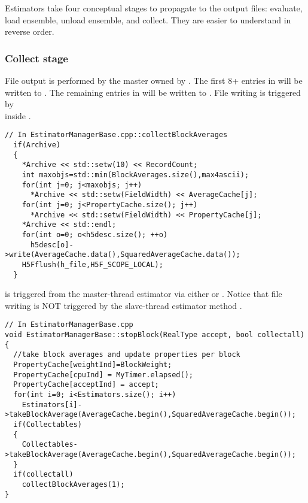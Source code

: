 Estimators take four conceptual stages to propagate to the output files: evaluate, load ensemble, unload ensemble, and collect. They are easier to understand in reverse order.

\subsubsection{Collect stage}
File output is performed by the master  owned by . The first 8+ entries in  will be written to . The remaining entries in  will be written to . File writing is triggered by \\  inside .

\begin{lstlisting}
// In EstimatorManagerBase.cpp::collectBlockAverages
  if(Archive)
  {
    *Archive << std::setw(10) << RecordCount;
    int maxobjs=std::min(BlockAverages.size(),max4ascii);
    for(int j=0; j<maxobjs; j++)
      *Archive << std::setw(FieldWidth) << AverageCache[j];
    for(int j=0; j<PropertyCache.size(); j++)
      *Archive << std::setw(FieldWidth) << PropertyCache[j];
    *Archive << std::endl;
    for(int o=0; o<h5desc.size(); ++o)
      h5desc[o]->write(AverageCache.data(),SquaredAverageCache.data());
    H5Fflush(h_file,H5F_SCOPE_LOCAL);
  }
\end{lstlisting}

 is triggered from the master-thread estimator via either  or . Notice that file writing is NOT triggered by the slave-thread estimator method .

\begin{lstlisting}
// In EstimatorManagerBase.cpp
void EstimatorManagerBase::stopBlock(RealType accept, bool collectall)
{
  //take block averages and update properties per block
  PropertyCache[weightInd]=BlockWeight;
  PropertyCache[cpuInd] = MyTimer.elapsed();
  PropertyCache[acceptInd] = accept;
  for(int i=0; i<Estimators.size(); i++)
    Estimators[i]->takeBlockAverage(AverageCache.begin(),SquaredAverageCache.begin());
  if(Collectables)
  { 
    Collectables->takeBlockAverage(AverageCache.begin(),SquaredAverageCache.begin());
  }
  if(collectall)
    collectBlockAverages(1);
}
\end{lstlisting}

